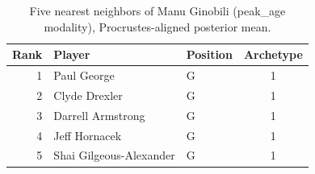 \begin{table}[htbp]
  \centering\small
  \begin{tabular}{rllc}
    \toprule
    Rank & Player & Position & Archetype \\
    \midrule
    1 & Paul George & G & 1 \\
    2 & Clyde Drexler & G & 1 \\
    3 & Darrell Armstrong & G & 1 \\
    4 & Jeff Hornacek & G & 1 \\
    5 & Shai Gilgeous-Alexander & G & 1 \\
    \bottomrule
  \end{tabular}
  \caption{Five nearest neighbors of Manu Ginobili (peak_age modality), Procrustes-aligned posterior mean.}
  \label{tab:Manu_Ginobili_neighbors_peak_age}
\end{table}


